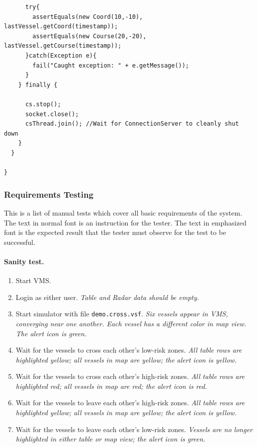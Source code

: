 \documentclass{article}
\begin{document}
\begin{verbatim}
      try{
        assertEquals(new Coord(10,-10), lastVessel.getCoord(timestamp));
        assertEquals(new Course(20,-20), lastVessel.getCourse(timestamp));
      }catch(Exception e){
        fail("Caught exception: " + e.getMessage());
      }
    } finally {

      cs.stop();
      socket.close();
      csThread.join(); //Wait for ConnectionServer to cleanly shut down
    }
  }

}
\end{verbatim}

\subsubsection{Requirements Testing}


This is a list of manual tests which cover all basic requirements of the system. The text in normal font is an instruction for the tester. The text in emphasized font is the expected result that the tester must observe for the test to be successful.

\paragraph{Sanity test.}

\begin{enumerate}
\item Start VMS.
\item Login as either user. \emph{Table and Radar data should be empty.}
\item Start simulator with file \verb|demo.cross.vsf|. \emph{Six vessels appear in VMS, converging near one another. Each vessel has a different color in map view. The alert icon is green.}
\item Wait for the vessels to cross each other's low-risk zones. \emph{All table rows are highlighted yellow; all vessels in map are yellow; the alert icon is yellow.}
\item Wait for the vessels to cross each other's high-risk zones. \emph{All table rows are highlighted red; all vessels in map are red; the alert icon is red.}
\item Wait for the vessels to leave each other's high-risk zones. \emph{All table rows are highlighted yellow; all vessels in map are yellow; the alert icon is yellow.}
\item Wait for the vessels to leave each other's low-risk zones. \emph{Vessels are no longer highlighted in either table or map view; the alert icon is green.}
\end{enumerate}
\end{document}
